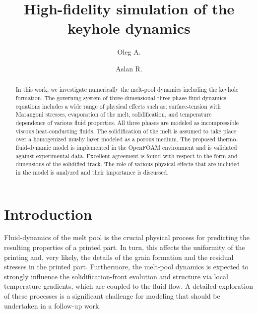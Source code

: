 \documentclass[final]{elsarticle} %
\newcommand{\OpenFOAM}{OpenFOAM\textregistered\xspace}
\newcommand{\alert}[1]{\textcolor{red}{#1}} %
\begin{document}
\begin{frontmatter}

\title{High-fidelity simulation of the keyhole dynamics}
\author[1]{Oleg A. }
\author[1]{Aslan R. }
\address[1]{\alert{Center of Materials \& Technologies},
    Skolkovo Institute of Science and Technology,
    Bolshoy Boulevard 30, bld. 1, Moscow, 121205, Russia}

\begin{abstract}
In this work, we investigate numerically the melt-pool dynamics including the keyhole formation.
The governing system of three-dimensional three-phase fluid dynamics equations
includes a wide range of physical effects such as: surface-tension with Marangoni stresses,
evaporation of the melt, solidification, and temperature dependence of various fluid properties.
%
All three phases are modeled as incompressible viscous heat-conducting fluids.
The solidification of the melt is assumed to take place over a homogenized mushy layer
modeled as a porous medium.
%
The proposed thermo-fluid-dynamic model is implemented in the \OpenFOAM environment
and is validated against experimental data.
Excellent agreement is found with respect to the form and dimensions of the solidified track.
The role of various physical effects that are included in the model is analyzed
and their importance is discussed.
\end{abstract}

\end{frontmatter}

\tableofcontents

\section{Introduction}

Fluid-dynamics of the melt pool is the crucial physical process
for predicting the resulting properties of a printed part.
In turn, this affects the uniformity of the printing and, very likely, the details of the grain formation
and the residual stresses in the printed part.
Furthermore, the melt-pool dynamics is expected to strongly influence the solidification-front evolution
and structure via local temperature gradients, which are coupled to the fluid flow.
A detailed exploration of these processes is a significant challenge for modeling
that should be undertaken in a follow-up work.
\end{document}
